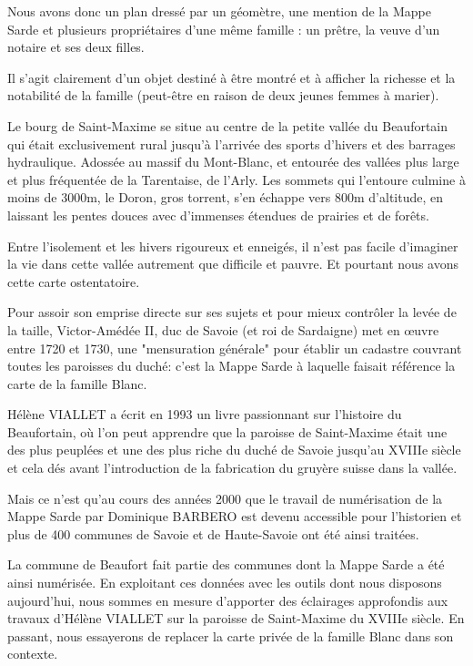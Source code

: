 \documentclass[12pt,a4paper]{report}
\begin{document}
Nous avons donc un plan dressé par un géomètre, une mention de la Mappe Sarde et plusieurs propriétaires d'une même famille : un prêtre, la veuve d'un notaire et ses deux filles.

Il s'agit clairement d'un objet destiné à être montré et à afficher la richesse et la notabilité de la famille (peut-être en raison de deux jeunes femmes à marier).

Le bourg de Saint-Maxime se situe au centre de la petite vallée du Beaufortain qui était exclusivement rural jusqu'à l'arrivée des sports d'hivers et des barrages hydraulique. Adossée au massif du Mont-Blanc, et entourée des vallées plus large et plus fréquentée de la Tarentaise, de l'Arly. Les sommets qui l'entoure culmine à moins de 3000m, le Doron, gros torrent, s'en échappe vers 800m d'altitude, en laissant les pentes douces avec d'immenses étendues de prairies et de forêts. 

Entre l'isolement et les hivers rigoureux et enneigés, il n'est pas facile d'imaginer la vie dans cette vallée autrement que difficile et pauvre. 
Et pourtant nous avons cette carte ostentatoire.

Pour assoir son emprise directe sur ses sujets et pour mieux contrôler la levée de la taille,  Victor-Amédée II, duc de Savoie (et roi de Sardaigne) met en œuvre entre 1720 et 1730, une "mensuration générale" pour établir un cadastre couvrant toutes les paroisses du duché: c'est la Mappe Sarde à laquelle faisait référence la carte de la famille Blanc.   

Hélène VIALLET a écrit en 1993 un livre passionnant sur l'histoire du Beaufortain, où l'on peut apprendre que la paroisse de Saint-Maxime était une des plus peuplées et une des plus riche du duché de Savoie jusqu'au XVIIIe siècle et cela dés avant l'introduction de la fabrication du gruyère suisse dans la vallée.

Mais ce n'est qu'au cours des années 2000 que le travail de numérisation de la Mappe Sarde par Dominique BARBERO est devenu accessible pour l'historien et  plus de 400 communes de Savoie et de Haute-Savoie ont été ainsi traitées.

La commune de Beaufort fait partie des communes dont la Mappe Sarde a été ainsi numérisée. En exploitant ces données avec les outils dont nous disposons aujourd'hui, nous sommes en mesure d'apporter des éclairages approfondis aux travaux d'Hélène VIALLET sur la paroisse de Saint-Maxime du XVIIIe siècle. En passant, nous essayerons de replacer la carte privée de la famille Blanc dans son contexte.
\end{document}
